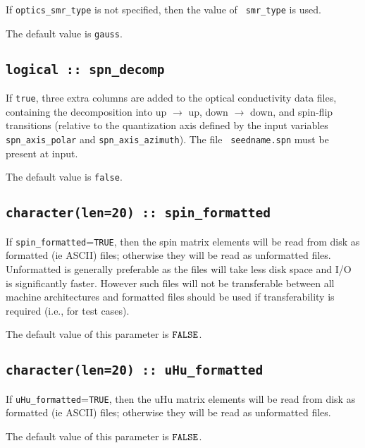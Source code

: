 If {\tt optics\_smr\_type} is not specified, then the value of {\tt
  smr\_type} is used.  

The default value is {\tt gauss}.

\subsection[spn\_decomp]{\tt logical :: spn\_decomp}
If {\tt true}, three extra columns are added to the optical
conductivity data files, containing the decomposition into up
$\rightarrow$ up, down $\rightarrow$ down, and spin-flip transitions
(relative to the quantization axis defined by the input variables {\tt
  spn\_axis\_polar} and {\tt spn\_axis\_azimuth}). The file {\tt
  seedname.spn} must be present at input.

The default value is \verb#false#.



\subsection[spin\_formated]{\tt character(len=20) :: spin\_formatted}

If \verb#spin_formatted#=\verb#TRUE#, then the spin matrix elements will be
read from disk as formatted (ie ASCII) files; otherwise they will be
read as unformatted files. Unformatted is generally preferable as the
files will take less disk space and I/O is significantly
faster. However such files will not be transferable between all
machine architectures and formatted files should be used if
transferability is required (i.e., for test cases).

The default value of this parameter is $\verb#FALSE#$.

\subsection[uHu\_formated]{\tt character(len=20) :: uHu\_formatted}

If \verb#uHu_formatted#=\verb#TRUE#, then the uHu matrix elements will be
read from disk as formatted (ie ASCII) files; otherwise they will be
read as unformatted files.

The default value of this parameter is $\verb#FALSE#$.


